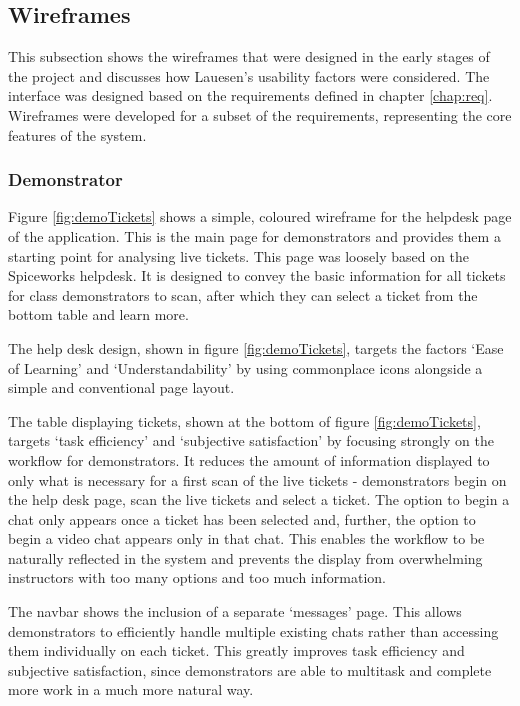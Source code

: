 \subsection{Wireframes}

This subsection shows the wireframes that were designed in the early stages of the project and discusses how Lauesen's usability factors were considered.  The interface was designed based on the requirements defined in chapter \ref{chap:req}. Wireframes were developed for a subset of the requirements, representing the core features of the system.

\subsubsection{Demonstrator}

Figure \ref{fig:demoTickets} shows a simple, coloured wireframe for the helpdesk page of the application. This is the main page for demonstrators and provides them a starting point for analysing live tickets. This page was loosely based on the Spiceworks helpdesk. It is designed to convey the basic information for all tickets for class demonstrators to scan, after which they can select a ticket from the bottom table and learn more. 

The help desk design, shown in figure \ref{fig:demoTickets}, targets the factors `Ease of Learning' and `Understandability' by using commonplace icons alongside a simple and conventional page layout.

The table displaying tickets, shown at the bottom of figure \ref{fig:demoTickets}, targets `task efficiency' and `subjective satisfaction' by focusing strongly on the workflow for demonstrators. It reduces the amount of information displayed to only what is necessary for a first scan of the live tickets - demonstrators begin on the help desk page, scan the live tickets and select a ticket. The option to begin a chat only appears once a ticket has been selected and, further, the option to begin a video chat appears only in that chat. This enables the workflow to be naturally reflected in the system and prevents the display from overwhelming instructors with too many options and too much information. 

The navbar shows the inclusion of a separate `messages' page. This allows demonstrators to efficiently handle multiple existing chats rather than accessing them individually on each ticket. This greatly improves task efficiency and subjective satisfaction, since demonstrators are able to multitask and complete more work in a much more natural way. 


